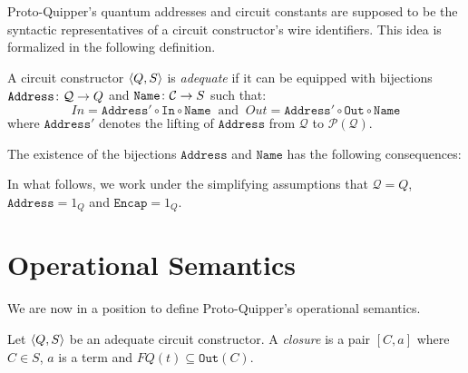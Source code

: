 \documentclass{article}
\begin{document}
Proto-Quipper's quantum addresses and circuit constants are supposed 
to be the syntactic representatives of a circuit constructor's wire 
identifiers. This idea is formalized in the following definition.

\begin{definition}
A circuit constructor $\langle Q,S\rangle$ is \emph{adequate} if it can 
be equipped with bijections $\mathtt{Address}\colon \mathcal{Q} \to Q$ 
and $\mathtt{Name}\colon \mathcal{C} \to S$ such that:
\[In=\mathtt{Address}' \circ\mathtt{In}\circ \mathtt{Name} 
~\mbox{ and }~ 
Out=\mathtt{Address}'\circ\mathtt{Out}\circ \mathtt{Name}
\]
where $\mathtt{Address}'$ denotes the lifting of $\mathtt{Address}$ 
from $\mathcal{Q}$ to $\mathcal{P}(\mathcal{Q})$.
\end{definition}

\begin{remark}
\label{structure-transfer}
The existence of the bijections $\mathtt{Address}$ and $\mathtt{Name}$ has 
the following consequences:

In what follows, we work under the simplifying assumptions that $\mathcal{Q}=Q$, 
$\mathtt{Address}=1_Q$ and $\mathtt{Encap}=1_Q$.
\end{remark}


\section{Operational Semantics}

We are now in a position to define Proto-Quipper's operational 
semantics.

\begin{definition}
Let $\langle Q,S\rangle$ be an adequate circuit constructor. A 
\emph{closure} is a pair $[C,a]$ where $C\in S$, $a$ is a 
term and $FQ(t)\subseteq\mathtt{Out}(C)$. 
\end{definition}
\end{document}
